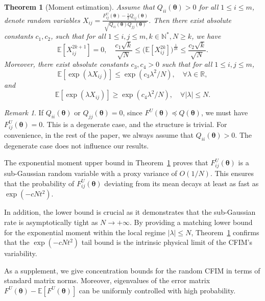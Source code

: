 \documentclass{amsart}
\theoremstyle{plain}
\newtheorem{theorem}{Theorem}
\theoremstyle{definition}
\theoremstyle{remark}
\newtheorem{remark}{Remark}
\newcommand{\thmref}[1]{Theorem~\ref{#1}}
\newcommand{\EE}{\mathbb{E}}
\begin{document}
\begin{theorem}[Moment estimation]
\label{thm:6}
Assume that $Q_{ii}(\bm\theta)>0$ for all $1\leq i\leq m$, denote random variables $X_{ij}=\frac{F^U_{ij}(\bm\theta)-\frac{1}{2}Q_{ij}(\bm\theta)}{\sqrt{Q_{ii}(\bm\theta)Q_{jj}(\bm\theta)}}$. Then there exist absolute constants $c_1,c_2$, such that for all $1\leq i,j\leq m,k\in \mathbb N^*,N\geq k$, we have
    \begin{equation}
    \label{eq:momentsk}
        \EE[X_{ij}^{2k+1}]=0,\quad \frac{c_1\sqrt k}{\sqrt N}\leq \bigl(\EE[X_{ij}^{2k}]\bigr)^{\frac{1}{2k}}\leq \frac{c_2\sqrt k}{\sqrt N}.
    \end{equation}
Moreover, there exist absolute constants $c_3,c_4>0$ such that for all $1\leq i,j\leq m$,
\begin{equation}
\label{eq:upper-expmom}
    \EE[\exp({\lambda X_{ij}})]\leq \exp (c_3\lambda^2/N),\quad \forall\lambda \in\mathbb R, 
\end{equation}
and
\begin{equation}
\label{eq:lower-expmom}
    \EE[\exp({\lambda X_{ij}})]\geq \exp (c_4\lambda^2/N),\quad \forall|\lambda|\leq  N. 
\end{equation}
\end{theorem}
\begin{remark}
    If $Q_{ii}(\bm\theta)$ or $Q_{jj}(\bm\theta)=0$, since $F^U(\bm\theta)\preceq Q(\bm\theta)$, we must have $F^U_{ij}(\bm\theta)=0$. This is a degenerate case, and the structure is trivial. For convenience, in the rest of the paper, we always assume that $Q_{ii}(\bm\theta)>0$. The degenerate case does not influence our results. 
\end{remark}
 The exponential moment upper bound in \thmref{thm:6} proves that $F^U_{ij}(\bm\theta)$ is a sub-Gaussian random variable with a proxy variance of $O(1/N)$. This ensures that the probability of $F^U_{ij}(\bm\theta)$ deviating from its mean decays at least as fast as $\exp(-cNt^2)$.

 In addition, the lower bound is crucial as it demonstrates that the sub-Gaussian rate is asymptotically tight as $N\to+\infty $. By providing a matching lower bound for the exponential moment within the local regime $|\lambda| \le N$, \thmref{thm:6} confirms that the $\exp(-cNt^2)$ tail bound is the intrinsic physical limit of the CFIM's variability.

 
As a supplement, we give concentration bounds for the random CFIM in terms of standard matrix norms.  Moreover, eigenvalues of the error matrix $F^U(\bm\theta)-\EE[F^U(\bm\theta)]$ can be uniformly controlled with high probability.
\end{document}
